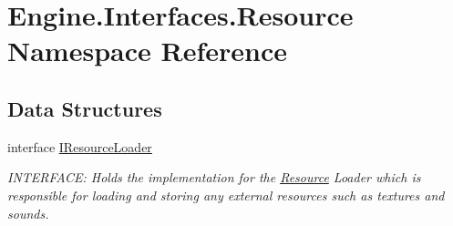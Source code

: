 \hypertarget{a00262}{}\section{Engine.\+Interfaces.\+Resource Namespace Reference}
\label{a00262}
\subsection*{Data Structures}
\begin{DoxyCompactItemize}
\item 
interface \hyperlink{a00462}{I\+Resource\+Loader}
\begin{DoxyCompactList}\small\item\em I\+N\+T\+E\+R\+F\+A\+CE\+: Holds the implementation for the \hyperlink{a00262}{Resource} Loader which is responsible for loading and storing any external resources such as textures and sounds. \end{DoxyCompactList}\end{DoxyCompactItemize}
